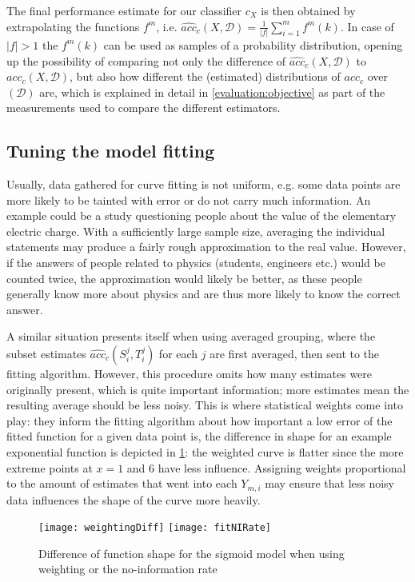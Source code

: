 The final performance estimate for our classifier $c_X$ is then obtained by extrapolating the functions $f^m$, i.e. $\widehat{acc}_c(X, \mathcal{D}) = \frac{1}{|f|} \sum_{i=1}^{m} f^m(k)$. In case of $|f| > 1$ the $f^m(k)$ can be used as samples of a probability distribution, opening up the possibility of comparing not only the difference of $\widehat{acc}_c(X, \mathcal{D})$ to $acc_c(X, \mathcal{D})$, but also how different the (estimated) distributions of $acc_c$ over $\mathcal{(D)}$ are, which is explained in detail in \ref{evaluation:objective} as part of the measurements used to compare the different estimators.

\subsection{Tuning the model fitting}
Usually, data gathered for curve fitting is not uniform, e.g. some data points are more likely to be tainted with error or do not carry much information. An example could be a study questioning people about the value of the elementary electric charge. With a sufficiently large sample size, averaging the individual statements may produce a fairly rough approximation to the real value. However, if the answers of people related to physics (students, engineers etc.) would be counted twice, the approximation would likely be better, as these people generally know more about physics and are thus more likely to know the correct answer.

A similar situation presents itself when using averaged grouping, where the subset estimates $\widehat{acc}_c(S^j_i, T^j_i)$ for each $j$ are first averaged, then sent to the fitting algorithm. However, this procedure omits how many estimates were originally present, which is quite important information; more estimates mean the resulting average should be less noisy. This is where statistical weights come into play: they inform the fitting algorithm about how important a low error of the fitted function for a given data point is, the difference in shape for an example exponential function is depicted in \ref{fig:weigthingExample}: the weighted curve is flatter since the more extreme points at $x = 1$ and $6$ have less influence. Assigning weights proportional to the amount of estimates that went into each $Y_{m,i}$ may ensure that less noisy data influences the shape of the curve more heavily.

\begin{figure}[h]
	\centering
	\texttt{[image: weightingDiff]}
	\texttt{[image: fitNIRate]}
	\caption{Difference of function shape for the sigmoid model when using weighting or the no-information rate}
	\label{fig:weigthingExample}
\end{figure}

